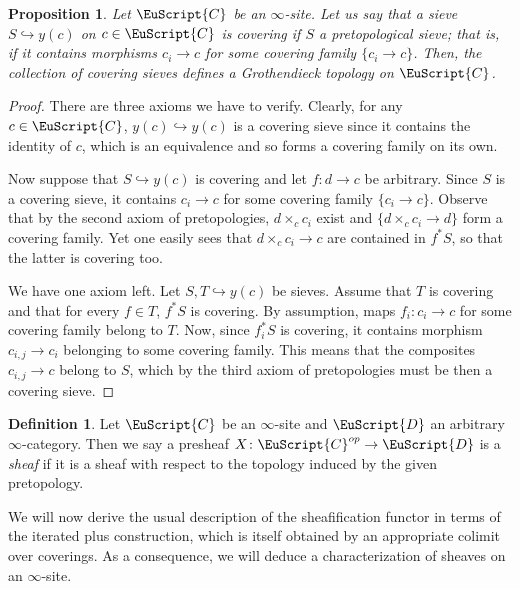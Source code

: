 \documentclass[oneside,a4paper]{amsart}
\newcommand{\euscr}[1]{\EuScript{#1}} %
\newcommand{\ccat}{\euscr{C}} %
\newcommand{\dcat}{\euscr{D}} %
\theoremstyle{plain}
\newtheorem{prop}[thm]{Proposition}
\theoremstyle{definition}
\newtheorem{defin}[thm]{Definition}
\theoremstyle{remark}
\begin{document}
\begin{prop}
Let $\ccat$ be an $\infty$-site. Let us say that a sieve $S \hookrightarrow y(c)$ on $c \in \ccat$ is \emph{covering} if $S$ a pretopological sieve; that is, if it contains morphisms $c_{i} \rightarrow c$ for some covering family $\{ c_{i} \rightarrow c \}$. Then, the collection of covering sieves defines a Grothendieck topology on $\ccat$.
\end{prop}

\begin{proof}
There are three axioms we have to verify. Clearly, for any $c \in \ccat$, $y(c) \hookrightarrow y(c)$ is a covering sieve since it contains the identity of $c$, which is an equivalence and so forms a covering family on its own. 

Now suppose that $S \hookrightarrow y(c)$ is covering and let $f \colon d \rightarrow c$ be arbitrary. Since $S$ is a covering sieve, it contains $c_{i} \rightarrow c$ for some covering family $\{ c_{i} \rightarrow c \}$. Observe that by the second axiom of pretopologies, $d \times _{c} c_{i}$ exist and $\{ d \times _{c} c_{i} \rightarrow d \}$ form a covering family. Yet one easily sees that $d \times _{c} c_{i} \rightarrow c$ are contained in $f^{*}S$, so that the latter is covering too. 

We have one axiom left. Let $S, T \hookrightarrow y(c)$ be sieves. Assume that $T$ is covering and that for every $f \in T$, $f^{*}S$ is covering. By assumption, maps $f_{i} \colon c_{i} \rightarrow c$ for some covering family belong to $T$. Now, since $f_{i}^{*}S$ is covering, it contains morphism $c_{i, j} \rightarrow c_{i}$ belonging to some covering family. This means that the composites $c_{i, j} \rightarrow c$ belong to $S$, which by the third axiom of pretopologies must be then a covering sieve. 
\end{proof}

\begin{defin}
Let $\ccat$ be an $\infty$-site and $\dcat$ an arbitrary $\infty$-category. Then we say a presheaf $X \colon \ccat^{op} \rightarrow \dcat$ is a \emph{sheaf} if it is a sheaf with respect to the topology induced by the given pretopology. 
\end{defin}
We will now derive the usual description of the sheafification functor in terms of the iterated plus construction, which is itself obtained by an appropriate colimit over coverings. As a consequence, we will deduce a characterization of sheaves on an $\infty$-site. 
\end{document}
